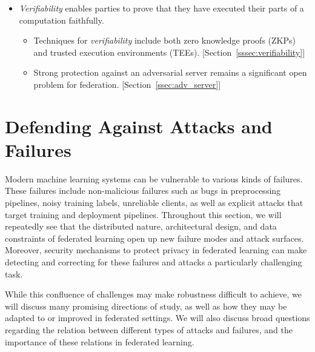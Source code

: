 \documentclass[11pt]{article}
\begin{document}
\begin{itemize}
\begin{itemize}
    \end{itemize}
    \item {\em Verifiability} enables parties to prove that they have executed their parts of a computation faithfully.
    \begin{itemize}
        \item Techniques for {\em verifiability} include both zero knowledge proofs (ZKPs) and trusted execution environments (TEEs).  [Section~\ref{sssec:verifiability}]
        \item Strong protection against an adversarial server remains a significant open problem for federation. [Section~\ref{ssec:adv_server}]
    \end{itemize}
\end{itemize}
 


\pagebreak
\section{Defending Against Attacks and Failures}
\label{sec:robust}

Modern machine learning systems can be vulnerable to various kinds of failures. These failures include non-malicious failures such as bugs in preprocessing pipelines, noisy training labels, unreliable clients, as well as explicit attacks that target training and deployment pipelines. Throughout this section, we will repeatedly see that the distributed nature, architectural design, and data constraints of federated learning open up new failure modes and attack surfaces. Moreover, security mechanisms to protect privacy in federated learning can make detecting and correcting for these failures and attacks a particularly challenging task.

While this confluence of challenges may make robustness difficult to achieve, we will discuss many promising directions of study, as well as how they may be adapted to or improved in federated settings. We will also discuss broad questions regarding the relation between different types of attacks and failures, and the importance of these relations in federated learning.
\end{document}
